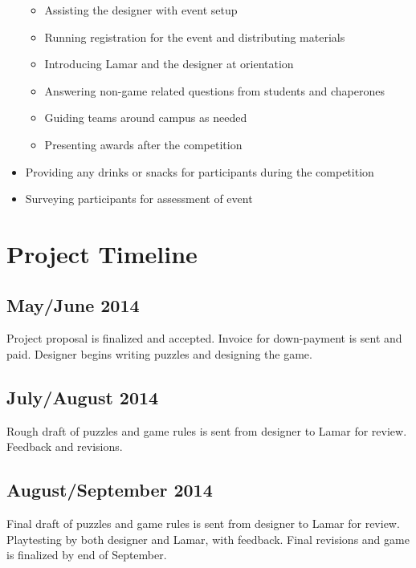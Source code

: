 \documentclass[11pt,letterpaper]{article}
\begin{document}
\begin{itemize}
    \begin{itemize}
      \item Assisting the designer with event setup
      \item Running registration for the event and distributing materials
      \item Introducing Lamar and the designer at orientation
      \item Answering non-game related questions from students and chaperones
      \item Guiding teams around campus as needed
      \item Presenting awards after the competition
    \end{itemize}
  \item Providing any drinks or snacks for participants during the competition
  \item Surveying participants for assessment of event
\end{itemize}



\newpage

\section{Project Timeline}

\subsection{May/June 2014}

Project proposal is finalized and accepted. Invoice for down-payment is 
sent and paid. Designer begins writing puzzles and designing the game.

\subsection{July/August 2014}

Rough draft of puzzles and game rules is sent from designer to Lamar for
review. Feedback and revisions. 

\subsection{August/September 2014}

Final draft of puzzles and game rules is sent from designer to Lamar for 
review. Playtesting by both designer and Lamar, with feedback. Final
revisions and game is finalized by end of September.
\end{document}

